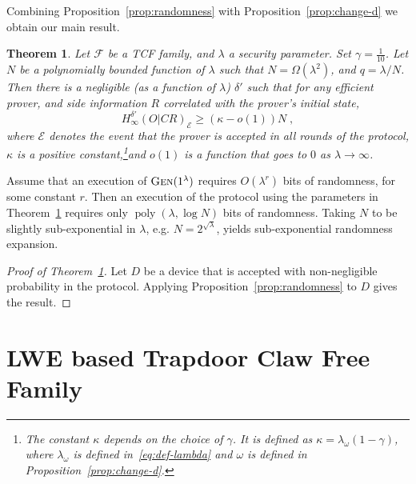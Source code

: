 \documentclass[11pt]{article}
\newtheorem{theorem}{Theorem}
\theoremstyle{remark}
\theoremstyle{definition}
\newcommand{\mE}{\ensuremath{\mathcal{E}}}
\DeclareMathOperator{\poly}{poly}
\newcommand{\Gen}{\textsc{Gen}}
\newcommand{\Hmin}{H_\infty}
\begin{document}
Combining Proposition~\ref{prop:randomness} with Proposition~\ref{prop:change-d} we obtain our main result. 


\begin{theorem}\label{thm:expansion}
Let $\mathcal{F}$ be a TCF family, and $\lambda$ a security parameter. Set $\gamma = \frac{1}{10}$. Let $N$ be a polynomially bounded function of $\lambda$ such that $N = \Omega(\lambda^2)$, and $q = \lambda/N$. Then there is a negligible (as a function of $\lambda$) $\delta'$ such that for any efficient prover, and side information $R$ correlated with the prover's initial state,
$$\Hmin^{\delta'}(O|CR)_{\mE} \geq  (\kappa-o(1)) N\;,$$
where $\mE$ denotes the event that the prover is accepted in all rounds of the protocol, $\kappa$ is a positive constant,\footnote{The constant $\kappa$ depends on the choice of $\gamma$. It is defined as $\kappa =\lambda_\omega(1-\gamma)$, where $\lambda_\omega$ is defined in~\eqref{eq:def-lambda} and $\omega$ is defined in Proposition~\ref{prop:change-d}.}and $o(1)$ is a function that goes to $0$ as $\lambda\to\infty$. 
\end{theorem}

Assume that an execution of $\Gen(1^\lambda)$ requires $O(\lambda^r)$ bits of randomness, for some constant $r$. Then an execution of the protocol using the parameters in Theorem~\ref{thm:expansion} requires only $\poly(\lambda,\log N)$ bits of randomness. Taking $N$ to be slightly sub-exponential in $\lambda$, e.g. $N=2^{\sqrt{\lambda}}$, yields sub-exponential randomness expansion. 

\begin{proof}[Proof of Theorem~\ref{thm:expansion}]
Let $D$ be a device that is accepted with non-negligible probability in the protocol. Applying Proposition~\ref{prop:randomness} to $D$ gives the result. 
\end{proof}

\appendix

\section{LWE based Trapdoor Claw Free Family}
\label{sec:lwetcf}





\notesendofpaper
\end{document}
